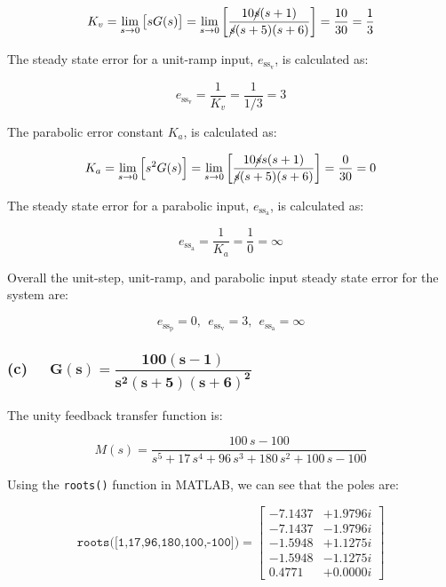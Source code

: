 \documentclass[12pt, letterpaper]{../assignment}
\begin{document}
$$ K_v = \lim_{s \to 0} \left[ s G(s) \right]
       = \lim_{s \to 0} \left[ \frac{10\cancel{s}(s + 1)}{\cancel{s}(s + 5)(s + 6)} \right]
       = \frac{10}{30}
       = \frac{1}{3} $$

The steady state error for a unit-ramp input, ${e_{\text{ss}_\text{v}}}$, is calculated as:

\begin{answer}
$$ {e_{\text{ss}_\text{v}}} = \frac{1}{K_v} = \frac{1}{1/3} = 3 $$
\end{answer}

The parabolic error constant $K_a$, is calculated as:

$$ K_a = \lim_{s \to 0} \left[ s^2 G(s) \right]
       = \lim_{s \to 0} \left[ \frac{10\cancel{s}s(s + 1)}{\cancel{s}(s + 5)(s + 6)} \right]
       = \frac{0}{30}
       = 0 $$

The steady state error for a parabolic input, ${e_{\text{ss}_\text{a}}}$, is calculated as:

\begin{answer}
$$ {e_{\text{ss}_\text{a}}} = \frac{1}{K_a} = \frac{1}{0} = \infty $$
\end{answer}

Overall the unit-step, unit-ramp, and parabolic input steady state error for the system are:

\begin{answer}
    $$ {e_{\text{ss}_\text{p}}} = 0, \ \ {e_{\text{ss}_\text{v}}} = 3, \ \ {e_{\text{ss}_\text{a}}} = \infty $$
\end{answer}

\subsubsection*{(c) \ \  $ \mathbf{ G(s) = \dfrac{100(s - 1)}{s^2(s + 5)(s + 6)^2}}$}

The unity feedback transfer function is:

$$ M(s) = \frac{100\,s-100}{s^5+17\,s^4+96\,s^3+180\,s^2+100\,s-100} $$

Using the \texttt{roots()} function in MATLAB, we can see that the poles are:

$$ \texttt{roots([1,17,96,180,100,-100])} = \left[ \begin{array}{cc} 
    -7.1437 &+ 1.9796i\\
    -7.1437 &- 1.9796i\\
    -1.5948 &+ 1.1275i\\
    -1.5948 &- 1.1275i\\
     0.4771 &+ 0.0000i
\end{array} \right] $$
\end{document}
